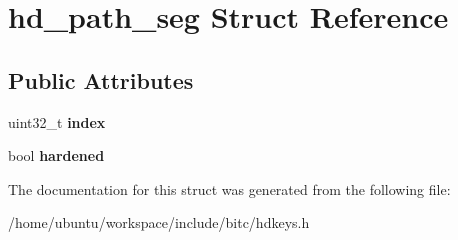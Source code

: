 \hypertarget{structhd__path__seg}{\section{hd\-\_\-path\-\_\-seg Struct Reference}
\label{structhd__path__seg}
}
\subsection*{Public Attributes}
\begin{DoxyCompactItemize}
\item 
\hypertarget{structhd__path__seg_a889038ffc5d27e90c3639fbfbf0a97c6}{uint32\-\_\-t {\bfseries index}}\label{structhd__path__seg_a889038ffc5d27e90c3639fbfbf0a97c6}

\item 
\hypertarget{structhd__path__seg_a86891de46212d2128a41910993848f73}{bool {\bfseries hardened}}\label{structhd__path__seg_a86891de46212d2128a41910993848f73}

\end{DoxyCompactItemize}


The documentation for this struct was generated from the following file\-:\begin{DoxyCompactItemize}
\item 
/home/ubuntu/workspace/include/bitc/hdkeys.\-h\end{DoxyCompactItemize}
